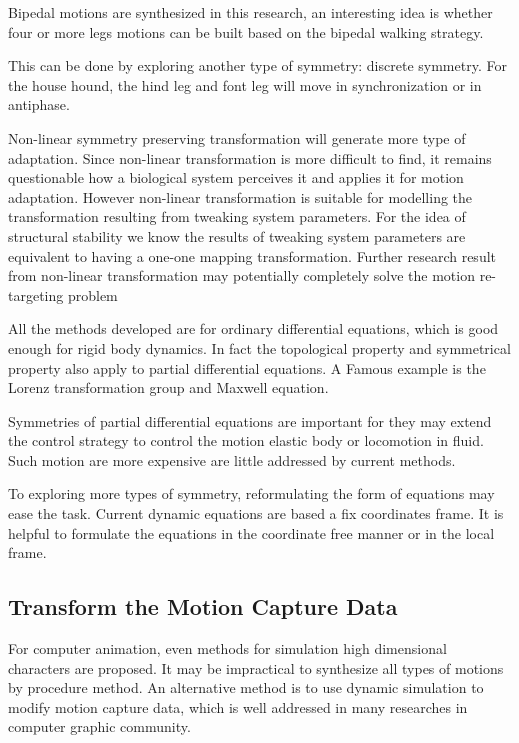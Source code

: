 \begin{itemize}

Bipedal motions are synthesized in this research, an interesting idea is whether four or more legs motions can be built based on the bipedal walking strategy.

This can be done by exploring another type of symmetry: discrete symmetry.
For the house hound, the hind leg and font leg will move in synchronization or in antiphase.




Non-linear symmetry preserving transformation will generate more type of adaptation.
Since non-linear transformation is more difficult to find, it remains questionable how a biological system perceives it and applies it for motion adaptation.
However non-linear transformation is suitable for modelling the transformation  resulting from tweaking system parameters.
For the idea of structural stability we know the results of tweaking system parameters are equivalent to having a one-one mapping transformation.
Further research result from non-linear transformation may potentially completely solve the motion re-targeting problem 



All the methods developed are for  ordinary differential equations, which is good enough for rigid body dynamics.
In fact the topological property and symmetrical property also apply to partial differential equations.
A Famous example is the Lorenz transformation group and Maxwell equation.

Symmetries of partial differential equations are important for they may extend the control strategy  to control the motion elastic body or locomotion in fluid.
Such motion are more expensive are little addressed by current \cms methods.


\end{itemize}

To exploring more types of symmetry, reformulating the form of equations may ease the task.
Current dynamic equations are based a fix coordinates frame.
It is helpful to formulate the equations in the coordinate free manner or in the local frame.






\subsection{Transform the Motion Capture Data}
For computer animation, even methods for simulation high dimensional characters are proposed.
It may be impractical to synthesize all types of motions by procedure method.
An alternative method is to use dynamic simulation to modify motion capture data, which is well addressed in many researches in computer graphic community.




